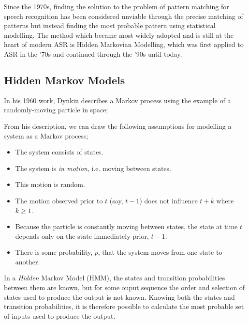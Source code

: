 Since the 1970s, finding the solution to the problem of pattern matching for speech recognition has been considered unviable through the precise matching of patterns but instead finding the most probable pattern using statistical modelling\cite{Rabiner2004Jan}.
The method which became most widely adopted and is still at the heart of modern ASR is Hidden Markovian Modelling, which was first applied to ASR in the '70s\cite{baker1975stochastic} and continued through the '90s\cite{bengio1999markovian} until today\cite{hmm2023}.

\subsection{Hidden Markov Models}

In his 1960 work\cite{dynkin1960}, Dynkin describes a Markov process using the example of a randomly-moving particle in space;


From his description, we can draw the following assumptions for modelling a system as a Markov process;

\begin{itemize}
  \item The system consists of states.
  \item The system is \emph{in motion}, i.e. moving between states.
  \item This motion is random.
  \item The motion observed prior to $t$ (say, $t-1$) does not influence $t+k$ where $k \geq 1$.
  \item Because the particle is constantly moving between states, the state at time $t$ depends only on the state immediately prior, $t-1$.
  \item There is some probability, $p$, that the system moves from one state to another.
\end{itemize}

In a \emph{Hidden} Markov Model (HMM), the states and transition probabilities between them are known, but for some ouput sequence the order and selection of states used to produce the output is not known.
Knowing both the states and transition probabilities, it is therefore possible to calculate the most probable set of inputs used to produce the output.

